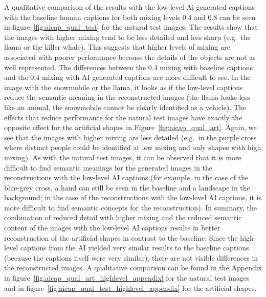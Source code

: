 A qualitative comparison of the results with the low-level Ai generated captions with the baseline human captions for both mixing levels 0.4 and 0.8 can be seen in figure~\ref{fig:aicap_qual_test} for the natural test images. The results show that the images with higher mixing tend to be less detailed and less sharp (e.g.\ the llama or the killer whale). This suggests that higher levels of mixing are associated with poorer performance because the details of the objects are not as well represented. The differences between the 0.4 mixing with baseline captions and the 0.4 mixing with AI generated captions are more difficult to see. In the image with the snowmobile or the llama, it looks as if the low-level captions reduce the semantic meaning in the reconstructed images (the llama looks less like an animal, the snowmobile cannot be clearly identified as a vehicle). The effects that reduce performance for the natural test images have exactly the opposite effect for the artificial shapes in Figure~\ref{fig:aicap_qual_art}. Again, we see that the images with higher mixing are less detailed (e.g.\ in the purple cross where distinct people could be identified at low mixing and only shapes with high mixing). As with the natural test images, it can be observed that it is more difficult to find semantic meanings for the generated images in the reconstructions with the low-level AI captions (for example, in the case of the blue-grey cross, a hand can still be seen in the baseline and a landscape in the background; in the case of the reconstructions with the low-level AI captions, it is more difficult to find semantic concepts for the reconstruction). In summary, the combination of reduced detail with higher mixing and the reduced semantic content of the images with the low-level AI captions results in better reconstruction of the artificial shapes in contrast to the baseline. Since the high-level captions from the AI yielded very similar results to the baseline captions (because the captions itself were very similar), there are not visible differences in the reconstructed images. A qualitative comparison can be found in the Appendix in figure~\ref{fig:aicap_qual_art_highlevel_appendix} for the natural test images and in figure~\ref{fig:aicap_qual_test_highlevel_appendix} for the artificial shapes.


